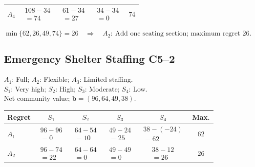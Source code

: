 {\begin{minipage}[t]{0.49\textwidth}
\begin{tabular}{lcccc}
				$A_4$&$\begin{gathered}108-34\\=74\end{gathered}$&$\begin{gathered}61-34\\=27\end{gathered}$&$\begin{gathered}34-34\\=0\end{gathered}$&$74$\\ \bottomrule\end{tabular}
	\end{minipage}
	\[\min\{62,26,49,74\}=26
	\quad\Longrightarrow\quad \boxed{A_2:\ \text{Add one seating section; maximum regret }26.}\]

	\subsection{Emergency Shelter Staffing \hfill C5--2}
	\noindent\begin{minipage}[t]{0.48\textwidth}
		\vspace{0pt}
		$A_1$: Full; $A_2$: Flexible; $A_3$: Limited staffing.\\
		$S_1$: Very high; $S_2$: High; $S_3$: Moderate; $S_4$: Low.\\
		Net community value; $\boldsymbol{b}=(96,64,49,38)$.
	\end{minipage}\hfill
	\begin{minipage}[t]{0.49\textwidth}
		\vspace{0pt}\centering
		\setlength{\tabcolsep}{3pt}
		\renewcommand{\arraystretch}{1.25}
		\begin{tabular}{lccccc}\toprule
				Regret &$S_1$&$S_2$&$S_3$&$S_4$&Max.\\ \midrule
				$A_1$&$\begin{gathered}96-96\\=0\end{gathered}$&$\begin{gathered}64-54\\=10\end{gathered}$&$\begin{gathered}49-24\\=25\end{gathered}$&$\begin{gathered}38-(-24)\\=62\end{gathered}$&$62$\\
				$A_2$&$\begin{gathered}96-74\\=22\end{gathered}$&$\begin{gathered}64-64\\=0\end{gathered}$&$\begin{gathered}49-49\\=0\end{gathered}$&$\begin{gathered}38-12\\=26\end{gathered}$&$26$\\

\end{tabular}
\end{minipage}}
